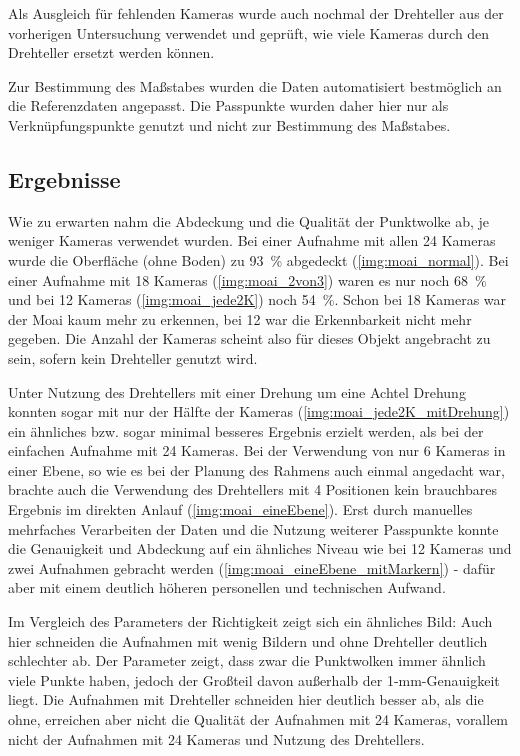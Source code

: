 \documentclass[./00PhotoBox.tex]{subfiles}
\begin{document}
Als Ausgleich für fehlenden Kameras wurde auch nochmal der Drehteller aus der vorherigen Untersuchung verwendet und geprüft, wie viele Kameras durch den Drehteller ersetzt werden können.

Zur Bestimmung des Maßstabes wurden die Daten automatisiert bestmöglich an die Referenzdaten angepasst. Die Passpunkte wurden daher hier nur als Verknüpfungspunkte genutzt und nicht zur Bestimmung des Maßstabes.

\subsection{Ergebnisse}
Wie zu erwarten nahm die Abdeckung und die Qualität der Punktwolke ab, je weniger Kameras verwendet wurden. Bei einer Aufnahme mit allen 24 Kameras wurde die Oberfläche (ohne Boden) zu 93~\% abgedeckt (\autoref{img:moai_normal}). Bei einer Aufnahme mit 18 Kameras (\autoref{img:moai_2von3}) waren es nur noch 68~\% und bei 12 Kameras (\autoref{img:moai_jede2K}) noch 54~\%.  Schon bei 18 Kameras war der Moai kaum mehr zu erkennen, bei 12 war die Erkennbarkeit nicht mehr gegeben. Die Anzahl der Kameras scheint also für dieses Objekt angebracht zu sein, sofern kein Drehteller genutzt wird.

Unter Nutzung des Drehtellers mit einer Drehung um eine Achtel Drehung konnten sogar mit nur der Hälfte der Kameras (\autoref{img:moai_jede2K_mitDrehung}) ein ähnliches bzw. sogar minimal besseres Ergebnis erzielt werden, als bei der einfachen Aufnahme mit 24 Kameras. Bei der Verwendung von nur 6 Kameras in einer Ebene, so wie es bei der Planung des Rahmens auch einmal angedacht war, brachte auch die Verwendung des Drehtellers mit 4 Positionen kein brauchbares Ergebnis im direkten Anlauf (\autoref{img:moai_eineEbene}). Erst durch manuelles mehrfaches Verarbeiten der Daten und die Nutzung weiterer Passpunkte konnte die Genauigkeit und Abdeckung auf ein ähnliches Niveau wie bei 12 Kameras und zwei Aufnahmen gebracht werden (\autoref{img:moai_eineEbene_mitMarkern}) - dafür aber mit einem deutlich höheren personellen und technischen Aufwand.

Im Vergleich des Parameters der Richtigkeit zeigt sich ein ähnliches Bild: Auch hier schneiden die Aufnahmen mit wenig Bildern und ohne Drehteller deutlich schlechter ab. Der Parameter zeigt, dass zwar die Punktwolken immer ähnlich viele Punkte haben, jedoch der Großteil davon außerhalb der 1-mm-Genauigkeit liegt. Die Aufnahmen mit Drehteller schneiden hier deutlich besser ab, als die ohne, erreichen aber nicht die Qualität der Aufnahmen mit 24 Kameras, vorallem nicht der Aufnahmen mit 24 Kameras und Nutzung des Drehtellers.
\end{document}

